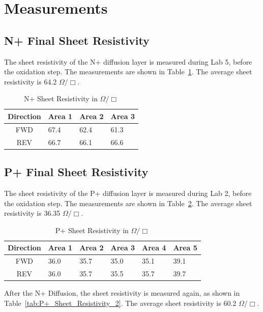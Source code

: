 \documentclass[letter,12pt]{article}
\begin{document}
\FloatBarrier
\section{Measurements}
	\subsection{N+ Final Sheet Resistivity}
		The sheet resistivity of the N+ diffusion layer is measured during Lab 5, before the oxidation step. The measurements are shown in Table~\ref{tab:N+_Sheet_Resistivity}.  The average sheet resistivity is  64.2 $\Omega/\Box$.
		
		\begin{table}[h!]
			\centering
			\begin{tabular}{c || l | l | l }
				Direction	& Area 1	& Area 2	& Area 3	\\
				\hline
				FWD			& 67.4		& 62.4		& 61.3		\\
				\hline
				REV			& 66.7		& 66.1		& 66.6		\\
				\hline
			\end{tabular}
			\caption{N+ Sheet Resistivity in $\Omega/\Box$}
			\label{tab:N+_Sheet_Resistivity}
		\end{table}
	
	\subsection{P+ Final Sheet Resistivity}
		The sheet resistivity of the P+ diffusion layer is measured during Lab 2, before the oxidation step. The measurements are shown in Table~\ref{tab:P+_Sheet_Resistivity_1}.  The average sheet resistivity is 36.35 $\Omega/\Box$.
		
		\begin{table}[h!]
			\centering
			\begin{tabular}{c || l | l | l | l | l}
				Direction	& Area 1	& Area 2	& Area 3	& Area 4	& Area 5	\\
				\hline
				FWD			& 36.0		& 35.7		& 35.0		& 35.1		& 39.1	\\
				\hline
				REV			& 36.0		& 35.7		& 35.5		& 35.7		& 39.7	\\
				\hline
			\end{tabular}
			\caption{P+ Sheet Resistivity in $\Omega/\Box$}
			\label{tab:P+_Sheet_Resistivity_1}
		\end{table}
		
		After the N+ Diffusion, the sheet resistivity is measured again, as shown in Table~\ref{tab:P+_Sheet_Resistivity_2}.  The average sheet resistivity is 60.2 $\Omega/\Box$.
		
\end{document}

